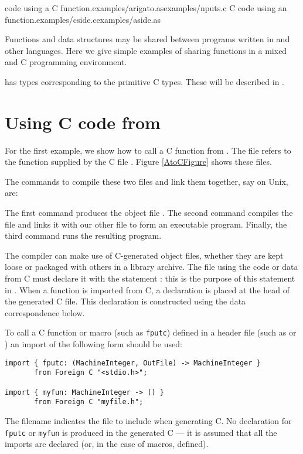 
%
{\asharp{} code using a C function.}{examples/arigato.as}{examples/nputs.c}
%
{C code using an \asharp{} function.}{examples/cside.c}{examples/aside.as}

Functions and data structures may be shared between programs written
in \asharp{} and other languages.  Here we give simple examples
of sharing functions in a mixed \asharp{} and C programming environment.

\asharp{} has types corresponding to the primitive C types.
These will be described in .

\section{Using C code from \asharp{}}

For the first example, we show how to call a C function from \asharp{}.
The \asharp{} file  refers to the function 
supplied by the C file .
Figure \ref{AtoCFigure} shows these files.

The commands to compile these two files and link them together,
say on Unix, are:

The first command produces the object file .
The second command compiles the file 
and links it with our other file to form an executable program.
Finally, the third command runs the resulting program.

The \asharp{} compiler can make use of C-generated object files,
whether they are kept loose or packaged with others in a library archive.
The \asharp{} file using the code or data from C must declare it with
the statement 
: this is the purpose of this
statement in .
When a function is imported from C, a declaration is placed at the
head of the generated C file. This declaration is constructed using
the data correspondence below. 

To call a C function or macro (such as {\tt fputc}) defined in a header file
(such as  or ) an import of the following form should be used:
\begin{verbatim}
import { fputc: (MachineInteger, OutFile) -> MachineInteger }
       from Foreign C "<stdio.h>";

import { myfun: MachineInteger -> () }
       from Foreign C "myfile.h";
\end{verbatim}
The filename indicates the file to include when generating C. No
declaration for {\tt fputc} or {\tt myfun} is produced in the generated C
--- it is assumed that all the imports are declared
(or, in the case of macros, defined). 


